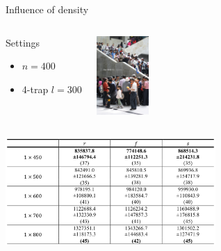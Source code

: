 \begin{frame}{Influence of density}
\begin{columns}
\begin{scriptsize}
\begin{block}{Settings}
 \begin{itemize}
 \item $n=400$
 \item 4-trap $l=300$
 \end{itemize}
\end{block}
\end{scriptsize}
\includegraphics[width=2cm]{images/crowd.png} 

\end{columns}
\centering
\includegraphics[width=8cm]{images/results2.png} 


\end{frame}


